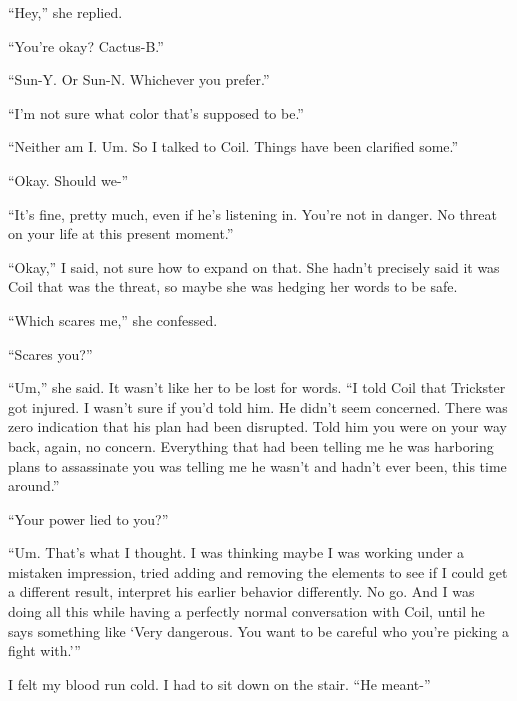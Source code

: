 ``Hey,'' she replied.



``You're okay?  Cactus-B.''



``Sun-Y.  Or Sun-N.  Whichever you prefer.''



``I'm not sure what color that's supposed to be.''



``Neither am I.  Um.  So I talked to Coil.  Things have been clarified some.''



``Okay.  Should we-''



``It's fine, pretty much, even if he's listening in.  You're not in danger.  No threat on your life at this present moment.''



``Okay,'' I said, not sure how to expand on that.  She hadn't precisely said it was Coil that was the threat, so maybe she was hedging her words to be safe.



``Which scares me,'' she confessed.



``Scares you?''



``Um,'' she said.  It wasn't like her to be lost for words.  ``I told Coil that Trickster got injured. I wasn't sure if you'd told him.  He didn't seem concerned.  There was zero indication that his plan had been disrupted.  Told him you were on your way back, again, no concern.  Everything that had been telling me he was harboring plans to assassinate you was telling me he wasn't and hadn't ever been, this time around.''



``Your power lied to you?''



``Um.  That's what I thought.  I was thinking maybe I was working under a mistaken impression, tried adding and removing the elements to see if I could get a different result, interpret his earlier behavior differently.  No go.  And I was doing all this while having a perfectly normal conversation with Coil, until he says something like `Very dangerous.  You want to be careful who you're picking a fight with.'''



I felt my blood run cold.  I had to sit down on the stair.  ``He meant-''



